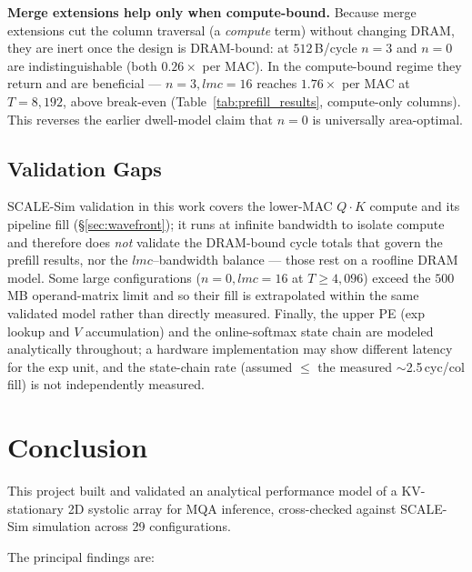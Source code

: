 \documentclass[11pt]{article}
\begin{document}
\textbf{Merge extensions help only when compute-bound.}
Because merge extensions cut the column traversal (a \emph{compute}
term) without changing DRAM, they are inert once the design is
DRAM-bound: at \(512\,\)B/cycle \(n = 3\) and \(n = 0\) are
indistinguishable (both \(0.26\times\) per MAC). In the compute-bound
regime they return and are beneficial --- \(n = 3, lmc = 16\) reaches
\(1.76\times\) per MAC at \(T = 8{,}192\), above break-even
(Table~\ref{tab:prefill_results}, compute-only columns). This reverses
the earlier dwell-model claim that \(n = 0\) is universally
area-optimal.

\subsection{Validation Gaps}
\label{sec:gaps}

SCALE-Sim validation in this work covers the lower-MAC \(Q\!\cdot\!K\)
compute and its pipeline fill (\S\ref{sec:wavefront}); it runs at
infinite bandwidth to isolate compute and therefore does \emph{not}
validate the DRAM-bound cycle totals that govern the prefill results,
nor the \(lmc\)--bandwidth balance --- those rest on a roofline DRAM
model. Some large configurations (\(n = 0, lmc = 16\) at \(T \geq
4{,}096\)) exceed the \(500\,\)MB operand-matrix limit and so their fill
is extrapolated within the same validated model rather than directly
measured. Finally, the upper PE (exp lookup and \(V\) accumulation) and
the online-softmax state chain are modeled analytically throughout; a
hardware implementation may show different latency for the exp unit, and
the state-chain rate (assumed \(\le\) the measured \(\sim\)2.5\,cyc/col
fill) is not independently measured.

\section{Conclusion}

This project built and validated an analytical performance model
of a KV-stationary 2D systolic array for MQA inference,
cross-checked against SCALE-Sim simulation across 29 configurations.

The principal findings are:
\end{document}
